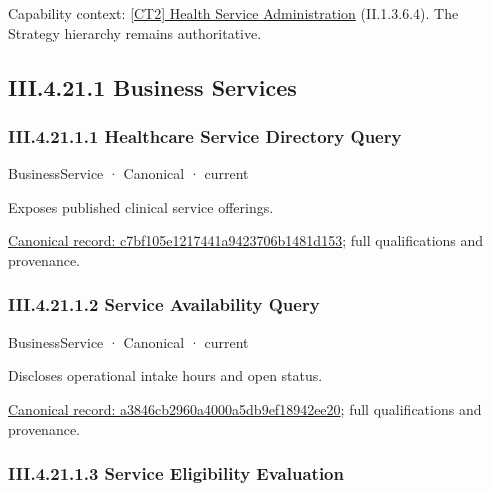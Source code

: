 {\small Capability context: \hyperref[element:ba68a52913a0499d8377553bddfa74a4]{[CT2] Health Service Administration} (II.1.3.6.4). The Strategy hierarchy remains authoritative.}\par
\subsection*{III.4.21.1 Business Services}
\label{navigation:III.4.21.1}

\subsubsection*{III.4.21.1.1 Healthcare Service Directory Query}
\label{navigation:III.4.21.1.1}

\label{element:c7bf105e1217441a9423706b1481d153}
{\small BusinessService · Canonical · current}\par

Exposes published clinical service offerings.


{\footnotesize \href{../../../../continuum/business/business-service/c7bf105e1217441a9423706b1481d153.md}{Canonical record: c7bf105e1217441a9423706b1481d153}; full qualifications and provenance.}\par
\subsubsection*{III.4.21.1.2 Service Availability Query}
\label{navigation:III.4.21.1.2}

\label{element:a3846cb2960a4000a5db9ef18942ee20}
{\small BusinessService · Canonical · current}\par

Discloses operational intake hours and open status.


{\footnotesize \href{../../../../continuum/business/business-service/a3846cb2960a4000a5db9ef18942ee20.md}{Canonical record: a3846cb2960a4000a5db9ef18942ee20}; full qualifications and provenance.}\par
\subsubsection*{III.4.21.1.3 Service Eligibility Evaluation}
\label{navigation:III.4.21.1.3}

